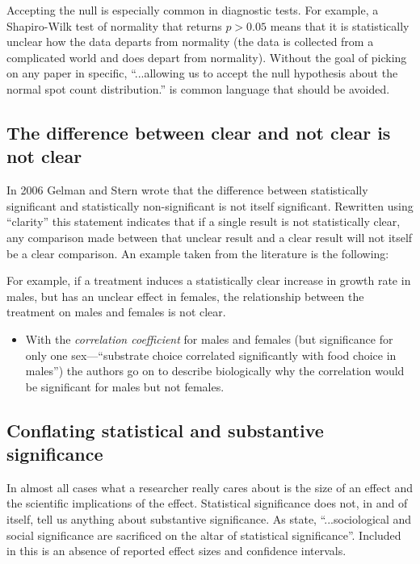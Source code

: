 
Accepting the null is especially common in diagnostic tests. For example, a Shapiro-Wilk test of normality that
returns $p > 0.05$ means that it is statistically unclear how the data departs from normality (the data is collected
from a complicated world and does depart from normality). Without the goal of picking on any paper in specific, 
``...allowing us to accept the null hypothesis about the normal spot count distribution.'' \citep{Karulinetal.2015} 
is common language that should be avoided.

\subsection*{The difference between clear and not clear is not clear}

In 2006 Gelman and Stern wrote that the difference between statistically significant and statistically non-significant is
not itself significant. Rewritten using ``clarity'' this statement indicates that if a single result is not statistically 
clear, any comparison made between that unclear result and a clear result will not itself be a clear comparison. An example
taken from the literature is the following: 

For example, if a treatment induces a statistically clear increase in growth rate in males, but has an unclear effect in 
females, the relationship between the treatment on males and females is not clear. 

\begin{itemize}
  \item With the \emph{correlation coefficient} for males and females (but significance for only one sex---``substrate 
  choice correlated significantly with food choice in males'') the authors go on to describe biologically why the 
  correlation would be significant for males but not females. \citep{MerilaitaandJormalainen1997}
\end{itemize}  

\subsection*{Conflating statistical and substantive significance}

In almost all cases what a researcher really cares about is the size of an effect and the scientific implications of the
effect. Statistical significance does not, in and of itself, tell us anything about substantive significance. As 
\citet{Bernardietal.2017} state, ``...sociological and social significance are sacrificed on the altar of statistical 
significance''. Included in this is an absence of reported effect sizes and confidence intervals.

